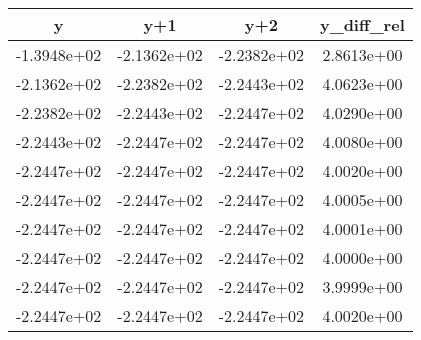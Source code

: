\begin{table}[htb]
    \centering
    \begin{tabular}{@{}cccc@{}}
        \toprule
        y & y+1 & y+2 & y\_diff\_rel \\ \hline
        \midrule
        -1.3948e+02 & -2.1362e+02 & -2.2382e+02 & 2.8613e+00 \\ \hline
        -2.1362e+02 & -2.2382e+02 & -2.2443e+02 & 4.0623e+00 \\ \hline
        -2.2382e+02 & -2.2443e+02 & -2.2447e+02 & 4.0290e+00 \\ \hline
        -2.2443e+02 & -2.2447e+02 & -2.2447e+02 & 4.0080e+00 \\ \hline
        -2.2447e+02 & -2.2447e+02 & -2.2447e+02 & 4.0020e+00 \\ \hline
        -2.2447e+02 & -2.2447e+02 & -2.2447e+02 & 4.0005e+00 \\ \hline
        -2.2447e+02 & -2.2447e+02 & -2.2447e+02 & 4.0001e+00 \\ \hline
        -2.2447e+02 & -2.2447e+02 & -2.2447e+02 & 4.0000e+00 \\ \hline
        -2.2447e+02 & -2.2447e+02 & -2.2447e+02 & 3.9999e+00 \\ \hline
        -2.2447e+02 & -2.2447e+02 & -2.2447e+02 & 4.0020e+00 \\ \hline
        \bottomrule
    \end{tabular}
\end{table}
